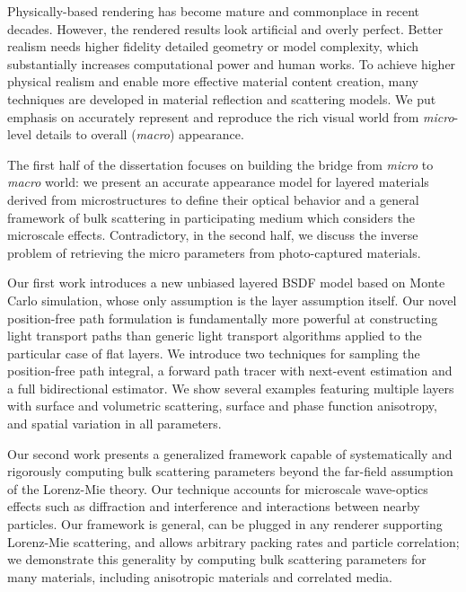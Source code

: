 \thesisabstract
{
  Physically-based rendering has become mature and commonplace in recent decades. However, the rendered results look artificial and overly perfect. Better realism needs higher fidelity detailed geometry or model complexity, which substantially increases computational power and human works. To achieve higher physical realism and enable more effective material content creation, many techniques are developed in material reflection and scattering models. We put emphasis on accurately represent and reproduce the rich visual world from \emph{micro}-level details to overall (\emph{macro}) appearance.

  The first half of the dissertation focuses on building the bridge from \emph{micro} to \emph{macro} world: we present an accurate appearance model for layered materials derived from microstructures to define their optical behavior and a general framework of bulk scattering in participating medium which considers the microscale effects. Contradictory, in the second half, we discuss the inverse problem of retrieving the micro parameters from photo-captured materials. 

  Our first work introduces a new unbiased layered BSDF model based on Monte Carlo simulation, whose only assumption is the layer assumption itself. Our novel position-free path formulation is fundamentally more powerful at constructing light transport paths than generic light transport algorithms applied to the particular case of flat layers. We introduce two techniques for sampling the position-free path integral, a forward path tracer with next-event estimation and a full bidirectional estimator. We show several examples featuring multiple layers with surface and volumetric scattering, surface and phase function anisotropy, and spatial variation in all parameters.

  Our second work presents a generalized framework capable of systematically and rigorously computing bulk scattering parameters beyond the far-field assumption of the Lorenz-Mie theory. Our technique accounts for microscale wave-optics effects such as diffraction and interference and interactions between nearby particles. Our framework is general, can be plugged in any renderer supporting Lorenz-Mie scattering, and allows arbitrary packing rates and particle correlation; we demonstrate this generality by computing bulk scattering parameters for many materials, including anisotropic materials and correlated media.

}
